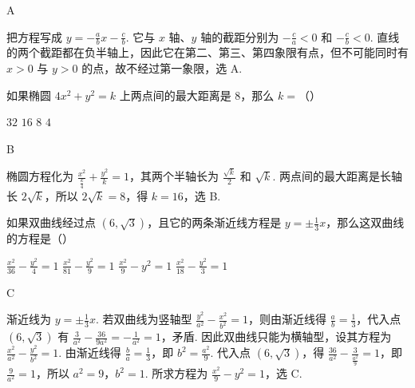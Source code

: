 \begin{answer}
A
\end{answer}

\begin{solution}
把方程写成 \(y=-\frac abx-\frac cb\). 它与 \(x\) 轴、\(y\) 轴的截距分别为 \(-\frac ca<0\) 和 \(-\frac cb<0\). 直线的两个截距都在负半轴上，因此它在第二、第三、第四象限有点，但不可能同时有 \(x>0\) 与 \(y>0\) 的点，故不经过第一象限，选 A.
\end{solution}

\begin{problem}
如果椭圆 \(4x^2+y^2=k\) 上两点间的最大距离是 \(8\)，那么 \(k=\)（\quad）

\choices
    {\(32\)}
    {\(16\)}
    {\(8\)}
    {\(4\)}
\end{problem}

\begin{answer}
B
\end{answer}

\begin{solution}
椭圆方程化为 \(\frac{x^2}{\frac{k}{4}}+\frac{y^2}{k}=1\)，其两个半轴长为 \(\frac{\sqrt{k}}2\) 和 \(\sqrt{k}\). 两点间的最大距离是长轴长 \(2\sqrt{k}\)，所以 \(2\sqrt{k}=8\)，得 \(k=16\)，选 B.
\end{solution}

\begin{problem}
如果双曲线经过点 \((6,\sqrt{3})\)，且它的两条渐近线方程是 \(y=\pm \frac{1}{3}x\)，那么这双曲线的方程是（\quad）

\choices
    {\(\frac{x^2}{36}-\frac{y^2}{4}=1\)}
    {\(\frac{x^2}{81}-\frac{y^2}{9}=1\)}
    {\(\frac{x^2}{9}-y^2=1\)}
    {\(\frac{x^2}{18}-\frac{y^2}{3}=1\)}
\end{problem}

\begin{answer}
C
\end{answer}

\begin{solution}
渐近线为 \(y=\pm\frac13x\). 若双曲线为竖轴型 \(\frac{y^2}{a^2}-\frac{x^2}{b^2}=1\)，则由渐近线得 \(\frac ab=\frac13\)，代入点 \((6,\sqrt3)\) 有 \(\frac3{a^2}-\frac{36}{9a^2}=-\frac1{a^2}=1\)，矛盾. 因此双曲线只能为横轴型，设其方程为 \(\frac{x^2}{a^2}-\frac{y^2}{b^2}=1\). 由渐近线得 \(\frac ba=\frac13\)，即 \(b^2=\frac{a^2}{9}\). 代入点 \((6,\sqrt3)\)，得 \(\frac{36}{a^2}-\frac{3}{\frac{a^2}{9}}=1\)，即 \(\frac9{a^2}=1\)，所以 \(a^2=9\)，\(b^2=1\). 所求方程为 \(\frac{x^2}{9}-y^2=1\)，选 C.
\end{solution}

